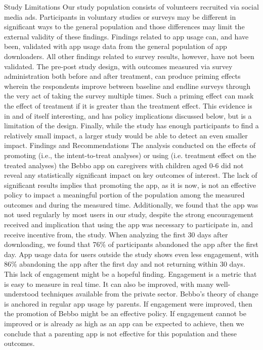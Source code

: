 \documentclass{article}
\begin{document}
Study Limitations
Our study population consists of volunteers recruited via social media ads. Participants in voluntary studies or surveys may be different in significant ways to the general population and those differences may limit the external validity of these findings. Findings related to app usage can, and have been, validated with app usage data from the general population of app downloaders. All other findings related to survey results, however, have not been validated.
The pre-post study design, with outcomes measured via survey administration both before and after treatment, can produce priming effects wherein the respondents improve between baseline and endline surveys through the very act of taking the survey multiple times. Such a priming effect can mask the effect of treatment if it is greater than the treatment effect. This evidence is in and of itself interesting, and has policy implications discussed below, but is a limitation of the design.
Finally, while the study has enough participants to find a relatively small impact, a larger study would be able to detect an even smaller impact.
Findings and Recommendations
The analysis conducted on the effects of promoting (i.e., the intent-to-treat analyses) or using (i.e. treatment effect on the treated analyses) the Bebbo app on caregivers with children aged 0-6 did not reveal any statistically significant impact on key outcomes of interest.
The lack of significant results implies that promoting the app, as it is now, is not an effective policy to impact a meaningful portion of the population among the measured outcomes and during the measured time.
Additionally, we found that the app was not used regularly by most users in our study, despite the strong encouragement received and implication that using the app was necessary to participate in, and receive incentive from, the study. When analyzing the first 30 days after downloading, we found that 76\% of participants abandoned the app after the first day. App usage data for users outside the study shows even less engagement, with 86\% abandoning the app after the first day and not returning within 30 days.
This lack of engagement might be a hopeful finding. Engagement is a metric that is easy to measure in real time. It can also be improved, with many well-understood techniques available from the private sector. Bebbo’s theory of change is anchored in regular app usage by parents. If engagement were improved, then the promotion of Bebbo might be an effective policy. If engagement cannot be improved or is already as high as an app can be expected to achieve, then we conclude that a parenting app is not effective for this population and these outcomes.
\end{document}
